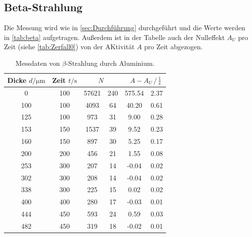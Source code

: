 \subsection{Beta-Strahlung}
\label{sub:beta_aus}
Die Messung wird wie in \autoref{sec:Durchführung} durchgeführt und die Werte werden in \autoref{tab:beta} aufgetragen. 
Außerdem ist in der Tabelle auch der Nulleffekt $A_U$ pro Zeit (siehe \autoref{tab:Zerfall0}) von der AKtivität $A$ pro Zeit abgezogen.

\begin{table}[H]
  \centering
  \caption{Messdaten von $\beta$-Strahlung durch Aluminium.}
  \label{tab:beta}
  \begin{tabular}{S[table-format=3.0] S[table-format=3.0] S[table-format=5.0] @{${}\pm{}$} S[table-format=3.2] S[table-format=3.2] @{${}\pm{}$} S[table-format=2.2]}
  \toprule
  {Dicke $d / \si{\micro\meter}$} & {Zeit $t / \si{\second}$} &  &  \\
     &   100 &   57621   &   240 &   575.54  &   2.37   \\
      100 &   100 &   4093    &   64  &   40.20   &   0.61    \\
      125 &   100 &   973     &   31  &   9.00    &   0.28    \\
      153 &   150 &   1537    &   39  &   9.52    &   0.23    \\
      160 &   150 &   897     &   30  &   5.25    &   0.17    \\
      200 &   200 &   456     &   21  &   1.55    &   0.08    \\
      253 &   300 &   207     &   14  &   -0.04   &   0.02    \\
      302 &   300 &   208     &   14  &   -0.04   &   0.02    \\
      338 &   300 &   225     &   15  &   0.02    &   0.02    \\
      400 &   400 &   280     &   17  &   -0.03   &   0.01    \\
      444 &   450 &   593     &   24  &   0.59    &   0.03    \\
      482 &   450 &   319     &   18  &   -0.02   &   0.01    \\
  \bottomrule
  \end{tabular}
\end{table}


